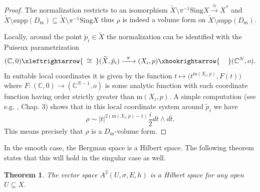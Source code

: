 \documentclass[11pt]{amsart}
\newtheorem{theorem}{Theorem}[section]
\theoremstyle{definition}
\newcommand{\bC}{{\mathbb C}}
\begin{document}
\begin{proof}
    The normalization restricts to an isomorphism $\widetilde{X}\setminus \pi^{-1}\text{Sing}X \xrightarrow{\ \cong\ } X^*$ and $\widetilde{X} \setminus \text{supp}(D_\text{m}) \subseteq \widetilde{X}\setminus \pi^{-1}\text{Sing}X$ thus $\rho$ is indeed a volume form on $\widetilde{X}\setminus \text{supp}(D_\text{m})$.

    Locally, around the point $\tilde{p}_{i} \in \widetilde{X}$ the normalization can be identified with the Puiseux parametrization
        $$(\mathbb{C},0)  \xleftrightarrow{\ \, \cong \, \ } (\widetilde{X},\tilde{p}_{i}) \xrightarrow{ \ \, \pi \ \, } (X_i,p) \xhookrightarrow{ \ \ \ \, } (\mathbb{C}^N,o).$$
    In suitable local coordinates it is given by the function $t \mapsto \big(t^{\text{m}(X_i,p)},F(t)\big)$
    where $F : (\bC,0) \to (\bC^{N-1},o)$ is some analytic function with each coordinate function having order strictly greater than $\text{m}(X_i,p)$. A simple computation (see e.g. \cite{RuppSera}, Chap. 3) shows that in this local coordinate system around $\tilde{p}_{i}$ we have
        \begin{equation*} \label{eq:wupp}
            \rho \sim |t|^{2(\text{m}(X_i,p)-1)}\frac{i}{2}dt\wedge d\bar{t}.
        \end{equation*}
        This means precisely that $\rho$ is a $D_\text{m}$-volume form.  
\end{proof} 

In the smooth case, the Bergman space is a Hilbert space. The following theorem states that this will hold in the singular case as well.

\begin{theorem}\label{thm:singhilb}         The vector space $A^2(U,\sigma,E,h )$ is a Hilbert space for any open $U \subseteq X$.
\end{theorem}
\end{document}
